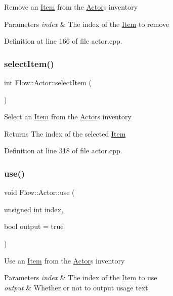 Remove an \hyperlink{class_flow_1_1_item}{Item} from the \hyperlink{class_flow_1_1_actor}{Actor}\textquotesingle{}s inventory 
\begin{DoxyParams}{Parameters}
{\em index} & The index of the \hyperlink{class_flow_1_1_item}{Item} to remove \\
\hline
\end{DoxyParams}


Definition at line 166 of file actor.\+cpp.

\hypertarget{class_flow_1_1_actor_a648ab8280efed25bb52cb065199b1dd6}{}\label{class_flow_1_1_actor_a648ab8280efed25bb52cb065199b1dd6} 
\subsubsection{\texorpdfstring{select\+Item()}{selectItem()}}
{\footnotesize\ttfamily int Flow\+::\+Actor\+::select\+Item (\begin{DoxyParamCaption}{ }\end{DoxyParamCaption})}

Select an \hyperlink{class_flow_1_1_item}{Item} from the \hyperlink{class_flow_1_1_actor}{Actor}\textquotesingle{}s inventory \begin{DoxyReturn}{Returns}
The index of the selected \hyperlink{class_flow_1_1_item}{Item} 
\end{DoxyReturn}


Definition at line 318 of file actor.\+cpp.

\hypertarget{class_flow_1_1_actor_ad6b899f59bde8718624f61159083c74d}{}\label{class_flow_1_1_actor_ad6b899f59bde8718624f61159083c74d} 
\subsubsection{\texorpdfstring{use()}{use()}}
{\footnotesize\ttfamily void Flow\+::\+Actor\+::use (\begin{DoxyParamCaption}\item[{unsigned int}]{index,  }\item[{bool}]{output = {\ttfamily true} }\end{DoxyParamCaption})}

Use an \hyperlink{class_flow_1_1_item}{Item} from the \hyperlink{class_flow_1_1_actor}{Actor}\textquotesingle{}s inventory 
\begin{DoxyParams}{Parameters}
{\em index} & The index of the \hyperlink{class_flow_1_1_item}{Item} to use \\
\hline
{\em output} & Whether or not to output usage text \\
\hline
\end{DoxyParams}


